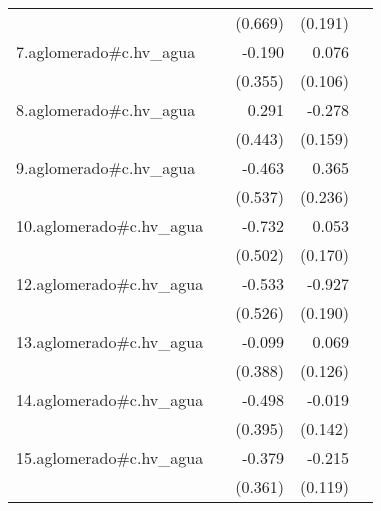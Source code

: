 {\begin{longtable}{l*{4}{D{.}{.}{-1}}}
            &                     &     (0.669)         &     (0.191)         &                     \\
\addlinespace
7.aglomerado#c.hv\_agua&                     &      -0.190         &       0.076         &                     \\
            &                     &     (0.355)         &     (0.106)         &                     \\
\addlinespace
8.aglomerado#c.hv\_agua&                     &       0.291         &      -0.278         &                     \\
            &                     &     (0.443)         &     (0.159)         &                     \\
\addlinespace
9.aglomerado#c.hv\_agua&                     &      -0.463         &       0.365         &                     \\
            &                     &     (0.537)         &     (0.236)         &                     \\
\addlinespace
10.aglomerado#c.hv\_agua&                     &      -0.732         &       0.053         &                     \\
            &                     &     (0.502)         &     (0.170)         &                     \\
\addlinespace
12.aglomerado#c.hv\_agua&                     &      -0.533         &      -0.927\sym{***}&                     \\
            &                     &     (0.526)         &     (0.190)         &                     \\
\addlinespace
13.aglomerado#c.hv\_agua&                     &      -0.099         &       0.069         &                     \\
            &                     &     (0.388)         &     (0.126)         &                     \\
\addlinespace
14.aglomerado#c.hv\_agua&                     &      -0.498         &      -0.019         &                     \\
            &                     &     (0.395)         &     (0.142)         &                     \\
\addlinespace
15.aglomerado#c.hv\_agua&                     &      -0.379         &      -0.215         &                     \\
            &                     &     (0.361)         &     (0.119)         &                     \\

\end{longtable}}
